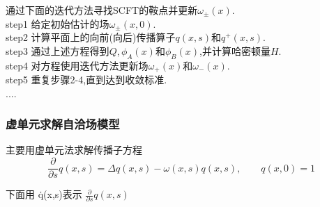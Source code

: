 \documentclass[12pt]{article}
\begin{document}
\begin{CJK}{UTF8}{gkai}
    
    通过下面的迭代方法寻找SCFT的鞍点并更新$\omega_{\pm}(x)$.\\
    
    
    step1 给定初始估计的场$\omega_{\pm}(x,0)$.\\
    
    step2 计算平面上的向前(向后)传播算子$q(x,s)$和$q^+(x,s)$.\\
    
    step3 通过上述方程得到$Q$,\,$\phi_A(x)$和$\phi_B(x)$,并计算哈密顿量$H$.\\
    
    step4 对方程使用迭代方法更新场$\omega_+(x)$和$\omega_-(x)$.\\
    
    step5 重复步骤2-4,直到达到收敛标准.\\
    
  ....\\
  \subsubsection{虚单元求解自洽场模型}
  
  主要用虚单元法求解传播子方程\\
  \begin{equation}
  \frac{\partial}{\partial s}q(x,s)=\Delta q(x,s)-\omega(x,s)q(x,s),\qquad q(x,0)=1   
  \end{equation} 
  
  下面用 \.{q}(x,s)表示 $\frac{\partial}{\partial s}q(x,s)$\\
  

\end{CJK}
\end{document}
